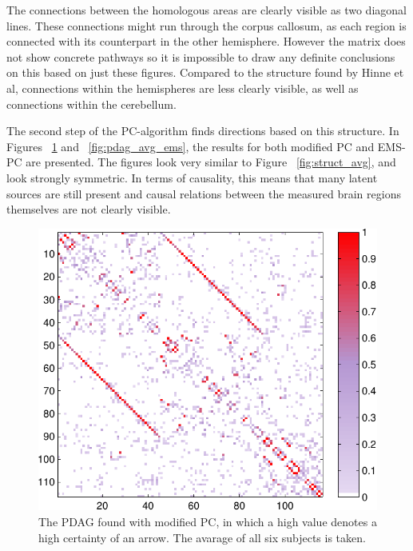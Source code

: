 \documentclass[a4paper, 10pt, english, onecolumn]{article}
\begin{document}
The connections between the homologous areas are clearly visible as two diagonal lines.
These connections might run through the corpus callosum, as each region is connected with its counterpart in the other hemisphere.
However the matrix does not show concrete pathways so it is impossible to draw any definite conclusions on this based on just these figures.
Compared to the structure found by Hinne et al, connections within the hemispheres are less clearly visible, as well as connections within the cerebellum.

The second step of the PC-algorithm finds directions based on this structure.
In Figures ~\ref{fig:pdag_avg_mod} and ~\ref{fig:pdag_avg_ems}, the results for both modified PC and EMS-PC are presented.
The figures look very similar to Figure ~\ref{fig:struct_avg}, and look strongly symmetric.
In terms of causality, this means that many latent sources are still present and causal relations between the measured brain regions themselves are not clearly visible.

\begin{figure}[h!]
  \centering
  \includegraphics{images/pdag_avg_colored_mod}
  \caption{The PDAG found with modified PC, in which a high value denotes a high certainty of an arrow. The avarage of all six subjects is taken.}
  \label{fig:pdag_avg_mod}
\end{figure}
\end{document}
